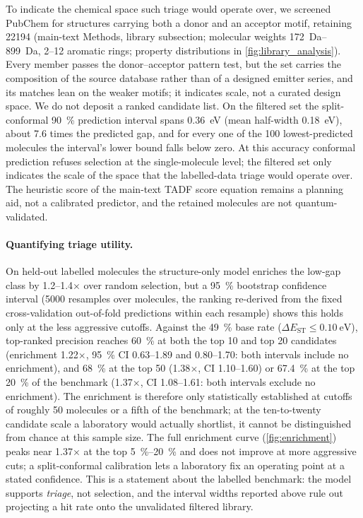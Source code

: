\documentclass[final,3p,times,twocolumn]{elsarticle}
\begin{document}
To indicate the chemical space such triage would operate over, we screened PubChem for
structures carrying both a donor and an acceptor motif, retaining \num{22194}
(main-text Methods, library subsection; molecular weights \qtyrange{172}{899}{\dalton},
\numrange{2}{12} aromatic rings; property distributions in
\cref{fig:library_analysis}). Every member passes the donor--acceptor pattern test,
but the set carries the composition of the source database rather than of a designed
emitter series, and its matches lean on the weaker motifs; it indicates scale, not a
curated design space. We do not deposit a
ranked candidate list. On the filtered set the split-conformal
\qty{90}{\percent} prediction interval spans \qty{0.36}{\electronvolt} (mean
half-width \qty{0.18}{\electronvolt}), about \num{7.6} times the predicted gap, and for
every one of the \num{100} lowest-predicted molecules the interval's lower bound
falls below zero. At this accuracy conformal prediction refuses selection at the
single-molecule level; the filtered set only indicates the scale of the space that the
labelled-data triage would operate over. The heuristic score of
the main-text TADF score equation remains a planning aid, not a calibrated predictor, and the
retained molecules are not quantum-validated.

\paragraph{Quantifying triage utility.}
On held-out labelled molecules the structure-only model enriches the low-gap
class by \numrange{1.2}{1.4}$\times$ over random selection, but a
\qty{95}{\percent} bootstrap confidence interval (\num{5000} resamples over
molecules, the ranking re-derived from the fixed cross-validation out-of-fold predictions within
each resample) shows this holds only at the less aggressive cutoffs. Against the
\qty{49}{\percent} base rate ($\Delta E_\text{ST} \le \qty{0.10}{\electronvolt}$),
top-ranked precision reaches \qty{60}{\percent} at both the top \num{10} and top
\num{20} candidates (enrichment \num{1.22}$\times$, \qty{95}{\percent} CI
\numrange{0.63}{1.89} and \numrange{0.80}{1.70}: both intervals include no
enrichment), and \qty{68}{\percent} at the top \num{50} (\num{1.38}$\times$, CI
\numrange{1.10}{1.60}) or \qty{67.4}{\percent} at the top \qty{20}{\percent} of the
benchmark (\num{1.37}$\times$, CI \numrange{1.08}{1.61}: both intervals exclude no
enrichment). The enrichment is therefore only statistically established at cutoffs
of roughly \num{50} molecules or a fifth of the benchmark; at the ten-to-twenty
candidate scale a laboratory would actually shortlist, it cannot be distinguished
from chance at this sample size. The full enrichment curve
(\cref{fig:enrichment}) peaks near \num{1.37}$\times$ at the top
\qtyrange{5}{20}{\percent} and does not improve at more aggressive cuts; a split-conformal
calibration lets a laboratory fix an operating point at a stated confidence. This
is a statement about the labelled benchmark: the model supports \emph{triage},
not selection, and the interval widths reported above rule out
projecting a hit rate onto the unvalidated filtered library.
\end{document}
